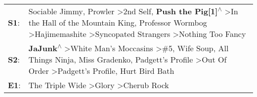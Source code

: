 \begin{supertabular}{p{0.03\textwidth}p{0.92\textwidth}}
 \textbf{S1}:  &    Sociable Jimmy\textsuperscript{}, \enspace Prowler\textsuperscript{} \textgreater \enspace 2nd Self\textsuperscript{}, \enspace \textbf{Push the Pig[1]\textsuperscript{$\wedge$}} \textgreater \enspace In the Hall of the Mountain King\textsuperscript{}, \enspace Professor Wormbog\textsuperscript{} \textgreater \enspace Hajimemashite\textsuperscript{} \textgreater \enspace Syncopated Strangers\textsuperscript{} \textgreater \enspace Nothing Too Fancy\textsuperscript{}  \enspace  \\
 \textbf{S2}:  &  \textbf{JaJunk\textsuperscript{$\wedge$}} \textgreater \enspace White Man's Moccasins\textsuperscript{} \textgreater \enspace \#5\textsuperscript{}, \enspace Wife Soup\textsuperscript{}, \enspace All Things Ninja\textsuperscript{}, \enspace Miss Gradenko\textsuperscript{}, \enspace Padgett's Profile\textsuperscript{} \textgreater \enspace Out Of Order\textsuperscript{} \textgreater \enspace Padgett's Profile\textsuperscript{}, \enspace Hurt Bird Bath\textsuperscript{}  \enspace  \\
 \textbf{E1}:  &                                                                                                                                                                                                                                                                                                                                                       The Triple Wide\textsuperscript{} \textgreater \enspace Glory\textsuperscript{} \textgreater \enspace Cherub Rock\textsuperscript{}  \enspace  \\
\end{supertabular}
